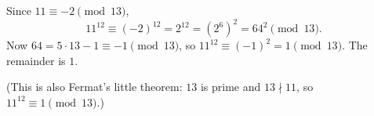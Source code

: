 Since $11\equiv-2\pmod{13}$,
\[
11^{12}\equiv(-2)^{12}=2^{12}=\left(2^6\right)^2=64^2\pmod{13}.
\]
Now $64=5\cdot13-1\equiv-1\pmod{13}$, so $11^{12}\equiv(-1)^2=1\pmod{13}$. The remainder is $\boxed{1}$.

(This is also Fermat's little theorem: $13$ is prime and $13\nmid11$, so $11^{12}\equiv1\pmod{13}$.)
